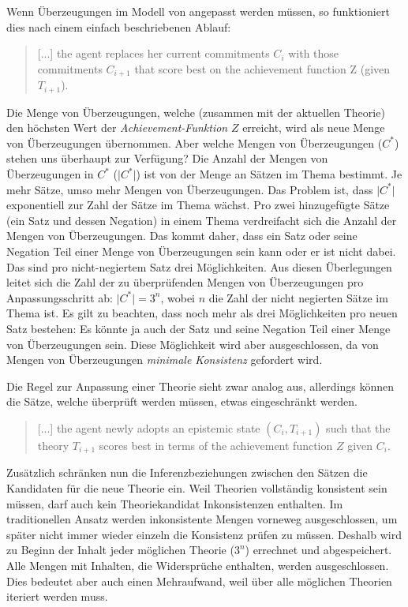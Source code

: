 \documentclass{article}
\begin{document}
Wenn Überzeugungen im Modell von \citeauthor{beisbart_making_2021} angepasst werden müssen, so funktioniert dies nach einem einfach beschriebenen Ablauf:

\begin{quote}
    [...] the agent replaces her current commitments $C_i$ with those commitments $C_{i+1}$ that score best on the achievement function Z (given $T_{i+1}$).
    \parencite[S.~450]{beisbart_making_2021}
\end{quote}

Die Menge von Überzeugungen, welche (zusammen mit der aktuellen Theorie) den höchsten Wert der \textit{Achievement-Funktion} $Z$ erreicht, wird als neue Menge von Überzeugungen übernommen. Aber welche Mengen von Überzeugungen ($C^*$) stehen uns überhaupt zur Verfügung? Die Anzahl der Mengen von Überzeugungen in $C^*$ ($\lvert C^* \lvert$) ist von der Menge an Sätzen im Thema bestimmt. Je mehr Sätze, umso mehr Mengen von Überzeugungen. Das Problem ist, dass $\lvert C^* \lvert$ exponentiell zur Zahl der Sätze im Thema wächst. Pro zwei hinzugefügte Sätze (ein Satz und dessen Negation) in einem Thema verdreifacht sich die Anzahl der Mengen von Überzeugungen. Das kommt daher, dass ein Satz oder seine Negation Teil einer Menge von Überzeugungen sein kann oder er ist nicht dabei. Das sind pro nicht-negiertem Satz drei Möglichkeiten. Aus diesen Überlegungen leitet sich die Zahl der zu überprüfenden Mengen von Überzeugungen pro Anpassungsschritt ab: $\lvert C^* \rvert = 3^n$, wobei $n$ die Zahl der nicht negierten Sätze im Thema ist. Es gilt zu beachten, dass noch mehr als drei Möglichkeiten pro neuen Satz bestehen: Es könnte ja auch der Satz und seine Negation Teil einer Menge von Überzeugungen sein. Diese Möglichkeit wird aber ausgeschlossen, da von Mengen von Überzeugungen \textit{minimale Konsistenz} gefordert wird.

Die Regel zur Anpassung einer Theorie sieht zwar analog aus, allerdings können die Sätze, welche überprüft werden müssen, etwas eingeschränkt werden.

\begin{quote}
    [...] the agent newly adopts an epistemic state $(C_i, T_{i+1})$ such that the theory $T_{i+1}$ scores best in terms of the achievement function $Z$ given $C_i$.
    \parencite[S.~450]{beisbart_making_2021}
\end{quote}

Zusätzlich schränken nun die Inferenzbeziehungen zwischen den Sätzen die Kandidaten für die neue Theorie ein. Weil Theorien vollständig konsistent sein müssen, darf auch kein Theoriekandidat Inkonsistenzen enthalten.
Im traditionellen Ansatz werden inkonsistente Mengen vorneweg ausgeschlossen, um später nicht immer wieder einzeln die Konsistenz prüfen zu müssen. Deshalb wird zu Beginn der Inhalt jeder möglichen Theorie ($3^n$) errechnet und abgespeichert. Alle Mengen mit Inhalten, die Widersprüche enthalten, werden ausgeschlossen. Dies bedeutet aber auch einen Mehraufwand, weil über alle möglichen Theorien iteriert werden muss.
\end{document}
